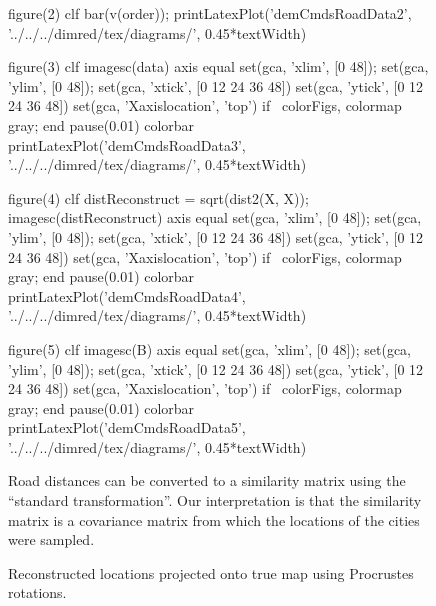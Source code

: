 \begin{figure}
\begin{octave}
    figure(2)
    clf
    bar(v(order));
    printLatexPlot('demCmdsRoadData2', '../../../dimred/tex/diagrams/', 0.45*textWidth)

    figure(3)
    clf
    imagesc(data)
    axis equal
    set(gca, 'xlim', [0 48]);
    set(gca, 'ylim', [0 48]);
    set(gca, 'xtick', [0 12 24 36 48])
    set(gca, 'ytick', [0 12 24 36 48])
    set(gca, 'Xaxislocation', 'top')
    if ~colorFigs, colormap gray; end
    pause(0.01)
    colorbar
    printLatexPlot('demCmdsRoadData3', '../../../dimred/tex/diagrams/', 0.45*textWidth)

    figure(4)
    clf
    distReconstruct = sqrt(dist2(X, X));
    imagesc(distReconstruct)
    axis equal
    set(gca, 'xlim', [0 48]);
    set(gca, 'ylim', [0 48]);
    set(gca, 'xtick', [0 12 24 36 48])
    set(gca, 'ytick', [0 12 24 36 48])
    set(gca, 'Xaxislocation', 'top')
    if ~colorFigs, colormap gray; end
    pause(0.01)
    colorbar
    printLatexPlot('demCmdsRoadData4', '../../../dimred/tex/diagrams/', 0.45*textWidth)

    figure(5)
    clf
    imagesc(B)
    axis equal
    set(gca, 'xlim', [0 48]);
    set(gca, 'ylim', [0 48]);
    set(gca, 'xtick', [0 12 24 36 48])
    set(gca, 'ytick', [0 12 24 36 48])
    set(gca, 'Xaxislocation', 'top')
    if ~colorFigs, colormap gray; end
    pause(0.01)
    colorbar
    printLatexPlot('demCmdsRoadData5', '../../../dimred/tex/diagrams/', 0.45*textWidth)
  \end{octave}
  \hfill

  \caption{Road distances can be converted to a similarity matrix using
    the ``standard transformation''. Our interpretation is that the
    similarity matrix is a covariance matrix from which the locations of
    the cities were sampled.}

\end{figure}



% 
\begin{figure}
  \begin{centering}
    
  \end{centering}

  \caption{Reconstructed locations projected
    onto true map using Procrustes rotations.}

\end{figure}

